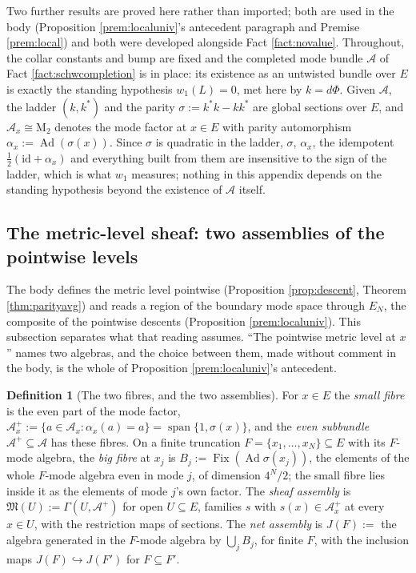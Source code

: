 \documentclass[11pt]{article}
\theoremstyle{definition}
\newtheorem{definition}[theorem]{Definition}
\newcommand{\Mat}{\mathrm{M}}
\newcommand{\id}{\mathrm{id}}
\newcommand{\shL}{L}
\newcommand{\EN}{E_{N}}
\newcommand{\Aa}{\mathcal{A}}
\begin{document}
Two further results are proved here rather than imported; both are used in the body (Proposition \ref{prem:localuniv}'s antecedent paragraph and Premise \ref{prem:local}) and both were developed alongside Fact \ref{fact:novalue}. Throughout, the collar constants and bump are fixed and the completed mode bundle $\Aa$ of Fact \ref{fact:schwcompletion} is in place: its existence as an untwisted bundle over $E$ is exactly the standing hypothesis $w_1(\shL) = 0$, met here by $k = d\Phi$. Given $\Aa$, the ladder $(k, k^{*})$ and the parity $\sigma := k^{*}k - kk^{*}$ are global sections over $E$, and $\Aa_x \cong \Mat_2$ denotes the mode factor at $x \in E$ with parity automorphism $\alpha_x := \operatorname{Ad}(\sigma(x))$. Since $\sigma$ is quadratic in the ladder, $\sigma$, $\alpha_x$, the idempotent $\tfrac12(\id + \alpha_x)$ and everything built from them are insensitive to the sign of the ladder, which is what $w_1$ measures; nothing in this appendix depends on the standing hypothesis beyond the existence of $\Aa$ itself.

\subsection{The metric-level sheaf: two assemblies of the pointwise levels}\label{app:mlsheaf}

The body defines the metric level pointwise (Proposition \ref{prop:descent}, Theorem \ref{thm:parityavg}) and reads a region of the boundary mode space through $\EN$, the composite of the pointwise descents (Proposition \ref{prem:localuniv}). This subsection separates what that reading assumes. ``The pointwise metric level at $x$'' names two algebras, and the choice between them, made without comment in the body, is the whole of Proposition \ref{prem:localuniv}'s antecedent.

\begin{definition}[The two fibres, and the two assemblies]\label{def:mlpresheaf}
For $x \in E$ the \emph{small fibre} is the even part of the mode factor, $\Aa_x^{+} := \{a \in \Aa_x : \alpha_x(a) = a\} = \operatorname{span}\{1, \sigma(x)\}$, and the \emph{even subbundle} $\Aa^{+} \subseteq \Aa$ has these fibres. On a finite truncation $F = \{x_1, \dots, x_N\} \subseteq E$ with its $F$-mode algebra, the \emph{big fibre} at $x_j$ is $B_j := \operatorname{Fix}(\operatorname{Ad}\sigma(x_j))$, the elements of the whole $F$-mode algebra even in mode $j$, of dimension $4^N/2$; the small fibre lies inside it as the elements of mode $j$'s own factor. The \emph{sheaf assembly} is $\mathfrak{M}(U) := \Gamma(U, \Aa^{+})$ for open $U \subseteq E$, families $s$ with $s(x) \in \Aa_x^{+}$ at every $x \in U$, with the restriction maps of sections. The \emph{net assembly} is $J(F) :=$ the algebra generated in the $F$-mode algebra by $\bigcup_j B_j$, for finite $F$, with the inclusion maps $J(F) \hookrightarrow J(F')$ for $F \subseteq F'$.
\end{definition}
\end{document}
